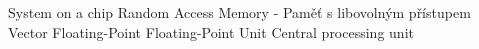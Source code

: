  {System on a chip}
 {Random Access Memory - Paměť s libovolným přístupem}
 {Vector Floating-Point}
 {Floating-Point Unit}
 {Central processing unit}